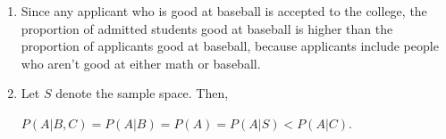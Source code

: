 \begin{enumerate}[label=(\alph*)]

\item Since any applicant who is good at baseball is accepted to the college,
the proportion of admitted students good at baseball is higher than the
proportion of applicants good at baseball, because applicants include people who
aren't good at either math or baseball.

\item Let $S$ denote the sample space. Then,

$P(A|B,C) = P(A|B) = P(A) = P(A|S) < P(A|C)$.

\end{enumerate}